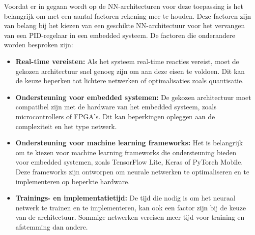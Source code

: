 Voordat er in gegaan wordt op de NN-architecturen voor deze toepassing is het belangrijk om met een aantal factoren rekening mee te houden. Deze factoren zijn van belang bij het kiezen van een geschikte NN-architectuur voor het vervangen van een PID-regelaar in een embedded systeem. De factoren die onderandere worden besproken zijn:
\begin{itemize}
  \item \textbf{Real-time vereisten:} Als het systeem real-time reacties vereist, moet de gekozen architectuur snel genoeg zijn om aan deze eisen te voldoen. Dit kan de keuze beperken tot lichtere netwerken of optimalisaties zoals quantisatie.
  \item \textbf{Ondersteuning voor embedded systemen:} De gekozen architectuur moet compatibel zijn met de hardware van het embedded systeem, zoals microcontrollers of FPGA's. Dit kan beperkingen opleggen aan de complexiteit en het type netwerk.
  \item \textbf{Ondersteuning voor machine learning frameworks:} Het is belangrijk om te kiezen voor machine learning frameworks die ondersteuning bieden voor embedded systemen, zoals TensorFlow Lite, Keras of PyTorch Mobile. Deze frameworks zijn ontworpen om neurale netwerken te optimaliseren en te implementeren op beperkte hardware.
  \item \textbf{Trainings- en implementatietijd:} De tijd die nodig is om het neuraal netwerk te trainen en te implementeren, kan ook een factor zijn bij de keuze van de architectuur. Sommige netwerken vereisen meer tijd voor training en afstemming dan andere.
\end{itemize}


